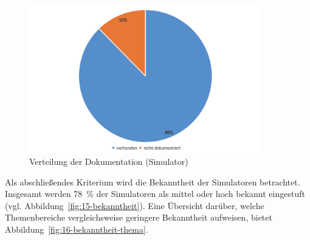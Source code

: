 \begin{figure}[!htbp]
    \centering
    \includegraphics[width=0.90\textwidth]{graphics_sim/14-dokumentation.png}
    \caption{Verteilung der Dokumentation (Simulator)}
    \label{fig:14-dokumentation}
\end{figure}

Als abschließendes Kriterium wird die Bekanntheit der Simulatoren betrachtet. Insgesamt werden 78~\% der Simulatoren als mittel oder hoch bekannt eingestuft (vgl. Abbildung~\ref{fig:15-bekanntheit}). Eine Übersicht darüber, welche Themenbereiche vergleichsweise geringere Bekanntheit aufweisen, bietet Abbildung~\ref{fig:16-bekanntheit-thema}.

